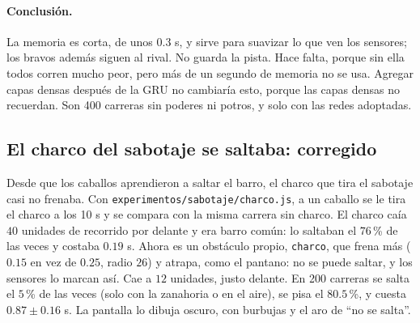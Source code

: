 \documentclass[11pt,letterpaper]{article}
\begin{document}
\paragraph{Conclusión.} La memoria es corta, de unos $0.3$ s, y sirve para suavizar lo que ven los sensores; los bravos además siguen al rival. No guarda la pista. Hace falta, porque sin ella todos corren mucho peor, pero más de un segundo de memoria no se usa. Agregar capas densas después de la GRU no cambiaría esto, porque las capas densas no recuerdan. Son 400 carreras sin poderes ni potros, y solo con las redes adoptadas.

\subsection{El charco del sabotaje se saltaba: corregido}
Desde que los caballos aprendieron a saltar el barro, el charco que tira el sabotaje casi no frenaba. Con \texttt{experimentos/sabotaje/charco.js}, a un caballo se le tira el charco a los 10 s y se compara con la misma carrera sin charco. El charco caía $40$ unidades de recorrido por delante y era barro común: lo saltaban el $76$\,\% de las veces y costaba $0.19$ s. Ahora es un obstáculo propio, \texttt{charco}, que frena más ($0.15$ en vez de $0.25$, radio $26$) y atrapa, como el pantano: no se puede saltar, y los sensores lo marcan así. Cae a $12$ unidades, justo delante. En 200 carreras se salta el $5$\,\% de las veces (solo con la zanahoria o en el aire), se pisa el $80.5$\,\%, y cuesta $0.87 \pm 0.16$ s. La pantalla lo dibuja oscuro, con burbujas y el aro de ``no se salta''.
\end{document}

